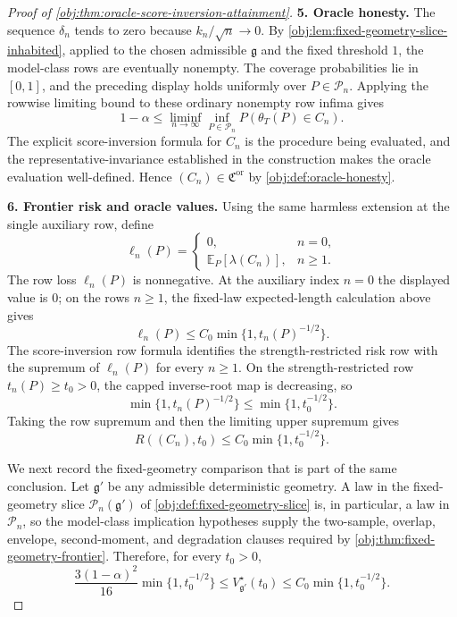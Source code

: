 \documentclass[11pt]{article}
\begin{document}
\begin{proof}[Proof of \cref{obj:thm:oracle-score-inversion-attainment}]
\textbf{5. Oracle honesty.}
The sequence \(\delta_n\) tends to zero because \(k_n/\sqrt n\to0\). By \cref{obj:lem:fixed-geometry-slice-inhabited}, applied to the chosen admissible \(\mathfrak g\) and the fixed threshold \(1\), the model-class rows are eventually nonempty. The coverage probabilities lie in \([0,1]\), and the preceding display holds uniformly over \(P\in\mathcal P_n\). Applying the rowwise limiting bound to these ordinary nonempty row infima gives
\[
1-\alpha
\le
\liminf_{n\to\infty}
\inf_{P\in\mathcal P_n}P(\theta_T(P)\in C_n).
\]
The explicit score-inversion formula for \(C_n\) is the procedure being evaluated, and the representative-invariance established in the construction makes the oracle evaluation well-defined. Hence \((C_n)\in\mathfrak C^{\mathrm{or}}\) by \cref{obj:def:oracle-honesty}. %

\textbf{6. Frontier risk and oracle values.}
Using the same harmless extension at the single auxiliary row, define
\[
\ell_n(P)=
\begin{cases}
0, & n=0,\\
\mathbb E_P[\lambda(C_n)], & n\ge1 .
\end{cases}
\]
The row loss \(\ell_n(P)\) is nonnegative. At the auxiliary index \(n=0\) the displayed value is \(0\); on the rows \(n\ge1\), the fixed-law expected-length calculation above gives
\[
\ell_n(P)
\le
C_0\min\{1,t_n(P)^{-1/2}\}.
\]
The score-inversion row formula identifies the strength-restricted risk row with the supremum of \(\ell_n(P)\) for every \(n\ge1\). On the strength-restricted row \(t_n(P)\ge t_0>0\), the capped inverse-root map is decreasing, so
\[
\min\{1,t_n(P)^{-1/2}\}
\le
\min\{1,t_0^{-1/2}\}.
\]
Taking the row supremum and then the limiting upper supremum gives
\[
R((C_n),t_0)
\le
C_0\min\{1,t_0^{-1/2}\}.
\] %

We next record the fixed-geometry comparison that is part of the same conclusion. Let \(\mathfrak g'\) be any admissible deterministic geometry. A law in the fixed-geometry slice \(\mathcal P_n(\mathfrak g')\) of \cref{obj:def:fixed-geometry-slice} is, in particular, a law in \(\mathcal P_n\), so the model-class implication hypotheses supply the two-sample, overlap, envelope, second-moment, and degradation clauses required by \cref{obj:thm:fixed-geometry-frontier}. Therefore, for every \(t_0>0\),
\[
\frac{3(1-\alpha)^2}{16}
\min\{1,t_0^{-1/2}\}
\le
V_{\mathfrak g'}^\star(t_0)
\le
C_0\min\{1,t_0^{-1/2}\}.
\] %


\end{proof}
\end{document}
